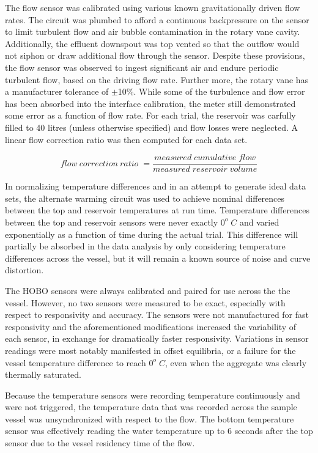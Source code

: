 \documentclass[12pt]{article}
\numberwithin{equation}{section}
\numberwithin{table}{section}
\numberwithin{figure}{section}
\begin{document}
The flow sensor was calibrated using various known gravitationally driven flow rates. The circuit was plumbed to afford a continuous backpressure on the sensor to limit turbulent flow and air bubble contamination in the rotary vane cavity. Additionally, the effluent downspout was top vented so that the outflow would not siphon or draw additional flow through the sensor. Despite these provisions, the flow sensor was observed to ingest significant air and endure periodic turbulent flow, based on the driving flow rate. Further more, the rotary vane has a manufacturer tolerance of $\pm$10\%. While some of the turbulence and flow error has been absorbed into the interface calibration, the meter still demonstrated some error as a function of flow rate. For each trial, the reservoir was carfully filled to 40 litres (unless otherwise specified) and flow losses were neglected. A linear flow correction ratio was then computed for each data set.

\[flow\:correction\:ratio\;=\frac{measured\;cumulative\;flow}{measured\;reservoir\;volume}\]

In normalizing temperature differences and in an attempt to generate ideal data sets, the alternate warming circuit was used to achieve nominal differences between the top and reservoir temperatures at run time. Temperature differences between the top and reservoir sensors were never exactly $0^o\;C$ and varied exponentially as a function of time during the actual trial. This difference will partially be absorbed in the data analysis by only considering temperature differences across the vessel, but it will remain a known source of noise and curve distortion. 

The HOBO sensors were always calibrated and paired for use across the the vessel. However, no two sensors were measured to be exact, especially with respect to responsivity and accuracy. The sensors were not manufactured for fast responsivity and the aforementioned modifications increased the variability of each sensor, in exchange for dramatically faster responsivity. Variations in sensor readings were most notably manifested in offset equilibria, or a failure for the vessel temperature difference to reach $0^o\;C$, even when the aggregate was clearly thermally saturated. 

Because the temperature sensors were recording temperature continuously and were not triggered, the temperature data that was recorded across the sample vessel was unsynchronized with respect to the flow. The bottom temperature sensor was effectively reading the water temperature up to 6 seconds after the top sensor due to the vessel residency time of the flow. 
\end{document}
